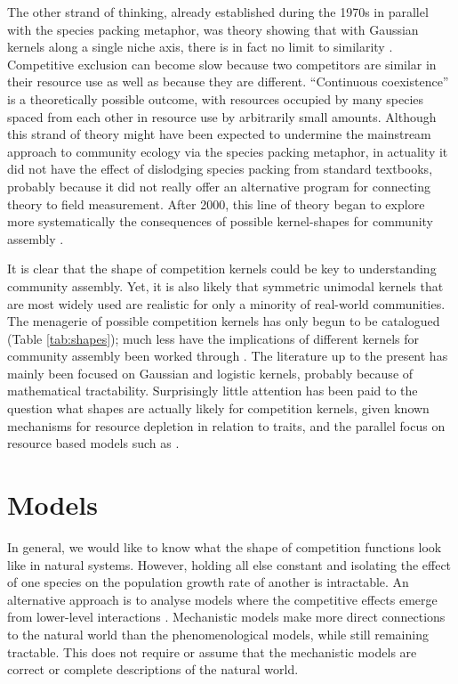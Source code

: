 \documentclass[a4paper,11pt]{article}
\begin{document}
The other strand of thinking, already established during the 1970s in
parallel with the species packing metaphor, was theory showing that
with Gaussian kernels along a single niche axis, there is in fact no
limit to similarity \citep{May-1972, Abrams-1975,
  Abrams-1983}. Competitive exclusion can become slow because two
competitors are similar in their resource use as well as because they
are different. ``Continuous coexistence'' is a theoretically possible
outcome, with resources occupied by many species spaced from each
other in resource use by arbitrarily small amounts.
Although this strand of theory might have been expected to undermine
the mainstream approach to community ecology via the species packing
metaphor, in actuality it did not have the effect of dislodging
species packing from standard textbooks, probably because it did not
really offer an alternative program for connecting theory to field
measurement.  After 2000, this line of theory began to explore more
systematically the consequences of possible kernel-shapes for
community assembly \citep{Scheffer-2006, Barabas-2013, Leimar-2013}.

It is clear that the shape of competition kernels 
could be key to
understanding community assembly. Yet, it is also likely that
symmetric unimodal kernels that are most widely used are realistic for only
a minority of
real-world communities. The menagerie of possible
competition
kernels has only begun to be catalogued (Table \ref{tab:shapes}); much
less have the implications of different kernels for community
assembly been worked through
\citep{Barabas-2012,Barabas-2013,DAndrea-2013,Leimar-2013}.  The
literature up to the present has mainly been focused on Gaussian and
logistic kernels, probably because of mathematical tractability.
Surprisingly little attention has been paid to the question what
shapes are actually likely for competition kernels, given known
mechanisms for resource depletion in relation to traits, and the
parallel focus on resource based models such as \Rstar.
\section{Models}

In general, we would like to know what the shape of competition
functions look like in natural systems.  However, holding all else
constant and isolating the effect of one species on the population
growth rate of another is intractable.
%
An alternative approach is to analyse models where the competitive
effects emerge from lower-level interactions
\citep[e.g.,][]{Draghi-2012}.  Mechanistic models make more direct
connections to the natural world than the phenomenological models,
while still remaining tractable.  This does not require or assume that
the mechanistic models are correct or complete descriptions of the
natural world.
\end{document}
